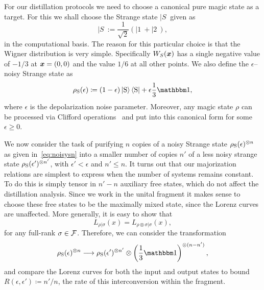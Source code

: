 \documentclass[pra,
aps,
twocolumn,
superscriptaddress,
groupedaddress,
nofootinbib,
reprint
]{revtex4-1}
\begin{document}
For our distillation protocols we need to choose a canonical pure magic state as a target. For this we shall choose the Strange state $|S\>$ given as
\begin{equation}
|S\> := \frac{1}{\sqrt{2}} (|1\> + |2\>),
\end{equation}
in the computational basis. The reason for this particular choice is that the Wigner distribution is very simple. Specifically $W_S(\boldsymbol{x})$ has a single negative value of $-1/3$ at $\boldsymbol{x} =(0,0)$ and the value $1/6$ at all other points. We also define the $\epsilon$--noisy Strange state as
\begin{equation}\label{eq:noisysn}
    \rho_{\rm{S}}(\epsilon)\coloneqq (1 - \epsilon) \ket{\rm{S}}\bra{\rm{S}} + \epsilon \frac{1}{3}\id,
\end{equation}
where $\epsilon$ is the depolarization noise parameter. Moreover, any magic state $\rho$ can be processed via Clifford operations~\cite{cit:prakash,cit:prakash2} and put into this canonical form for some $\epsilon \ge 0$.

We now consider the task of purifying $n$ copies of a noisy Strange state $\rho_{\rm{S}}(\epsilon)^{\otimes n}$ as given in~\cref{eq:noisysn} into a smaller number of copies $n'$ of a less noisy strange state $\rho_{\rm{S}}(\epsilon')^{\otimes n'}$, with $\epsilon' < \epsilon$ and $n' \leq n$. It turns out that our majorization relations are simplest to express when the number of systems remains constant. To do this is simply tensor in $n'-n$ auxiliary free states, which do not affect the distillation analysis. Since we work in the unital fragment it makes sense to choose these free states to be the maximally mixed state, since the Lorenz curves are unaffected.  More generally, it is easy to show that
\begin{equation}
L_{\rho |\sigma} (x) = L_{\rho\otimes \sigma |\sigma}(x),
\end{equation}
for any full-rank $\sigma \in \mathcal{F}$. Therefore, we can consider the transformation
\begin{equation}\label{eq:sudist}
	\rho_{\rm{S}}(\epsilon)^{\otimes n} \longrightarrow \rho_{\rm{S}}(\epsilon')^{\otimes n'} \otimes \left( \frac{1}{3}\id \right)^{\otimes (n-n')},
\end{equation}
and compare the Lorenz curves for both the input and output states to bound $R(\epsilon, \epsilon') \coloneqq n'/n$, the rate of this interconversion within the fragment.
\end{document}
